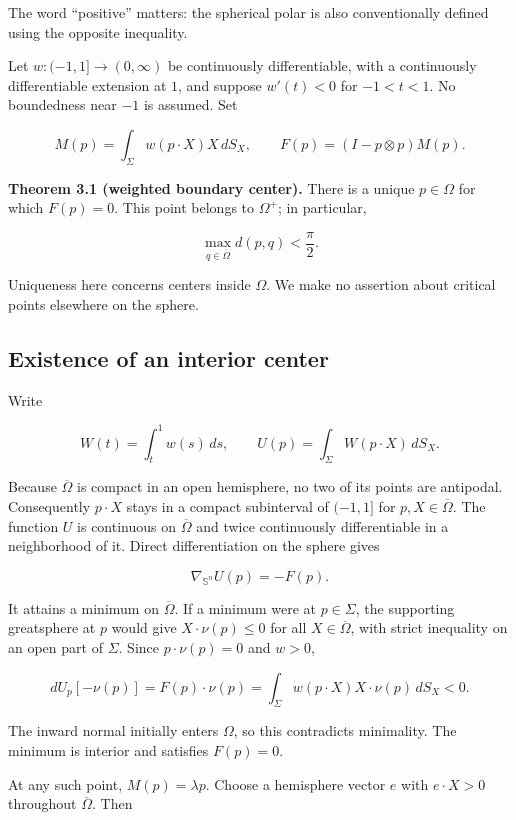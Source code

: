 \documentclass[11pt]{article}
\begin{document}
The word ``positive'' matters: the spherical polar is also
conventionally defined using the opposite inequality.

Let \(w:(-1,1]\to(0,\infty)\) be continuously differentiable, with a
continuously differentiable extension at \(1\), and suppose \(w'(t)<0\)
for \(-1<t<1\). No boundedness near \(-1\) is assumed. Set

\[
M(p)=\int_\Sigma w(p\cdot X)X\,dS_X,\qquad
F(p)=(I-p\otimes p)M(p).
\tag{3.3}
\]

\textbf{Theorem 3.1 (weighted boundary center).} There is a unique
\(p\in\Omega\) for which \(F(p)=0\). This point belongs to \(\Omega^+\);
in particular,

\[
\max_{q\in\overline\Omega}d(p,q)<\frac{\pi}{2}.
\tag{3.4}
\]

Uniqueness here concerns centers inside \(\Omega\). We make no assertion
about critical points elsewhere on the sphere.

\subsection{Existence of an interior
center}\label{existence-of-an-interior-center}

Write

\[
W(t)=\int_t^1w(s)\,ds,\qquad
U(p)=\int_\Sigma W(p\cdot X)\,dS_X.
\tag{3.5}
\]

Because \(\overline\Omega\) is compact in an open hemisphere, no two of
its points are antipodal. Consequently \(p\cdot X\) stays in a compact
subinterval of \((-1,1]\) for \(p,X\in\overline\Omega\). The function
\(U\) is continuous on \(\overline\Omega\) and twice continuously
differentiable in a neighborhood of it. Direct differentiation on the
sphere gives

\[
\nabla_{\mathbb S^n}U(p)=-F(p).
\tag{3.6}
\]

It attains a minimum on \(\overline\Omega\). If a minimum were at
\(p\in\Sigma\), the supporting greatsphere at \(p\) would give
\(X\cdot\nu(p)\leq0\) for all \(X\in\overline\Omega\), with strict
inequality on an open part of \(\Sigma\). Since \(p\cdot\nu(p)=0\) and
\(w>0\),

\[
dU_p[-\nu(p)]
=F(p)\cdot\nu(p)
=\int_\Sigma w(p\cdot X)X\cdot\nu(p)\,dS_X<0.
\tag{3.7}
\]

The inward normal initially enters \(\Omega\), so this contradicts
minimality. The minimum is interior and satisfies \(F(p)=0\).

At any such point, \(M(p)=\lambda p\). Choose a hemisphere vector \(e\)
with \(e\cdot X>0\) throughout \(\overline\Omega\). Then
\end{document}
